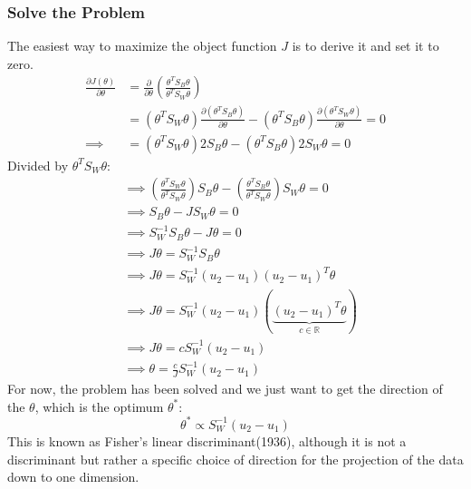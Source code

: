 \documentclass[a4paper]{article}
\begin{document}
\subsubsection{Solve the Problem}
The easiest way to maximize the object function $J$ is to derive it and set it to zero.
\begin{align*}
	\frac {\partial J(\theta)}{\partial \theta} &= \frac {\partial } {\partial \theta} (\frac{\theta^T S_B \theta} {\theta^T S_W \theta}) \\
	&= (\theta^T S_W \theta) \frac{\partial (\theta^T S_B \theta)} {\partial \theta} - (\theta^T S_B \theta) \frac {\partial (\theta^T S_W \theta)} {\partial \theta} = 0 \\
	\implies &= (\theta^T S_W \theta) 2 S_B \theta - (\theta^T S_B \theta) 2 S_W \theta = 0
\end{align*}
Divided by $\theta^T S_W \theta:$ 
\begin{align*}
	&\implies (\frac{\theta^T S_W \theta} {\theta^T S_W \theta})S_B\theta - (\frac{\theta^T S_B \theta} {\theta^T S_W \theta})S_W \theta = 0 \\
	&\implies S_B \theta - J S_W \theta = 0 \\
	&\implies S^{-1}_W S_B \theta - J\theta = 0 \\
	&\implies  J\theta = S^{-1}_W S_B \theta  \\
	&\implies  J\theta = S^{-1}_W (u_2 - u_1)(u_2 - u_1)^T \theta  \\
	&\implies  J\theta = S^{-1}_W (u_2 - u_1) (\underbrace{(u_2 - u_1)^T \theta}_{c \in \mathbb{R}})  \\
	&\implies  J\theta = c S^{-1}_W(u_2 - u_1)   \\
	&\implies \theta = \frac{c}{J} S^{-1}_W(u_2 - u_1)
\end{align*}
For now, the problem has been solved and we just want to get the direction of the $\theta$, which is the optimum $ \theta^\ast$:
$$
	\theta^{\ast}  \propto S^{-1}_W(u_2 - u_1)
$$
This is known as Fisher's linear discriminant(1936), although it is not a discriminant but rather a specific choice of direction for the projection of the data down to one dimension. 
\end{document}

